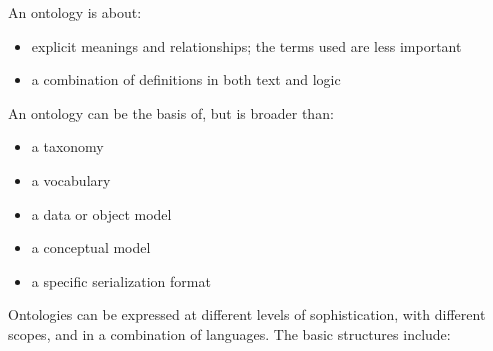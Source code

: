 %
%

An ontology is about:

\begin{itemize}
    \item explicit meanings and relationships; the terms used are less important
    \item a combination of definitions in both text and logic
\end{itemize}

An ontology can be the basis of, but is broader than:
\begin{itemize}
    \item a taxonomy
    \item a vocabulary
    \item a data or object model
    \item a conceptual model
    \item a specific serialization format
\end{itemize}

Ontologies can be expressed at different levels of sophistication, with different scopes,
and in a combination of languages.
The basic structures include:

